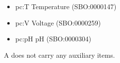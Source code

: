 \begin{glyphDescription}
\begin{center}
  \begin{itemize}\setlength{\parskip}{0ex}
  \item{pc:T} Temperature (SBO:0000147)
  \item{pc:V} Voltage (SBO:0000259)
  \item{pc:pH} pH (SBO:0000304)
  \end{itemize}
\end{center}

    
\glyphAux A  does not carry any auxiliary items.  

\end{glyphDescription}


